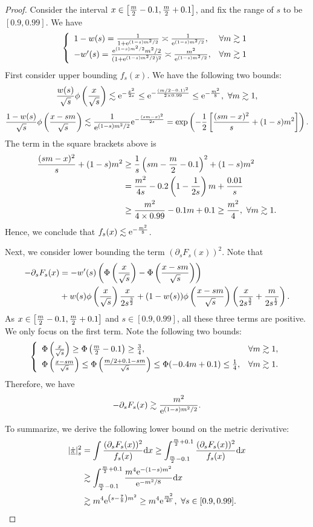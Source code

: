 \begin{proof}
Consider the interval $x\in\left[\frac{m}{2}-0.1,\frac{m}{2}+0.1\right]$, and fix the range of $s$ to be $[0.9,0.99]$. We have
$$\left\{
\begin{array}{ll}
     1-w(s)=\frac{1}{1+\mathrm{e}^{(1-s)m^2/2}}\asymp\frac{1}{\mathrm{e}^{(1-s)m^2/2}},&\forall m\gtrsim1 \\
     -w'(s)=\frac{\mathrm{e}^{(1-s)m^2/2}m^2/2}{(1+\mathrm{e}^{(1-s)m^2/2})^2}\asymp\frac{m^2}{\mathrm{e}^{(1-s)m^2/2}},&\forall m\gtrsim1
\end{array}
\right.$$
First consider upper bounding $f_s(x)$. We have the following two bounds:
$$\frac{w(s)}{\sqrt{s}}\phi\left(\frac{x}{\sqrt{s}}\right)\lesssim\mathrm{e}^{-\frac{x^2}{2s}}\le\mathrm{e}^{-\frac{(m/2-0.1)^2}{2\times0.99}}\le\mathrm{e}^{-\frac{m^2}{8}},~\forall m\gtrsim1,$$
$$\frac{1-w(s)}{\sqrt{s}}\phi\left(\frac{x-sm}{\sqrt{s}}\right)\lesssim\frac{1}{\mathrm{e}^{(1-s)m^2/2}}\mathrm{e}^{-\frac{(sm-x)^2}{2s}}=\exp\left(-\frac{1}{2}\left[\frac{(sm-x)^2}{s}+(1-s)m^2\right]\right).$$
The term in the square brackets above is
\begin{align*}
    \frac{(sm-x)^2}{s}+(1-s)m^2&\ge\frac{1}{s}\left(sm-\frac{m}{2}-0.1\right)^2+(1-s)m^2\\
    &=\frac{m^2}{4s}-0.2\left(1-\frac{1}{2s}\right)m+\frac{0.01}{s}\\
    &\ge\frac{m^2}{4\times0.99}-0.1m+0.1\ge\frac{m^2}{4},~\forall m\gtrsim1.
\end{align*}
Hence, we conclude that $f_s(x)\lesssim\mathrm{e}^{-\frac{m^2}{8}}$.

Next, we consider lower bounding the term $(\partial_sF_s(x))^2$. Note that
\begin{align*}
    -\partial_sF_s(x)&=-w'(s)\left(\Phi\left(\frac{x}{\sqrt{s}}\right)-\Phi\left(\frac{x-sm}{\sqrt{s}}\right)\right)\\
    &+w(s)\phi\left(\frac{x}{\sqrt{s}}\right)\frac{x}{2s^{\frac32}}+(1-w(s))\phi\left(\frac{x-sm}{\sqrt{s}}\right)\left(\frac{x}{2s^{\frac32}}+\frac{m}{2s^{\frac12}}\right).    
\end{align*}
As $x\in\left[\frac{m}{2}-0.1,\frac{m}{2}+0.1\right]$ and $s\in[0.9,0.99]$, all these three terms are positive. We only focus on the first term. Note the following two bounds:
$$\left\{
\begin{array}{ll}
\Phi\left(\frac{x}{\sqrt{s}}\right)\ge\Phi\left(\frac{m}{2}-0.1\right)\ge\frac{3}{4},&\forall m\gtrsim1,\\
\Phi\left(\frac{x-sm}{\sqrt{s}}\right)\le\Phi\left(\frac{m/2+0.1-sm}{\sqrt{s}}\right)\le\Phi(-0.4m+0.1)\le\frac{1}{4},&\forall m\gtrsim1.
\end{array}
\right.$$
Therefore, we have
$$-\partial_sF_s(x)\gtrsim\frac{m^2}{\mathrm{e}^{(1-s)m^2/2}}.$$

To summarize, we derive the following lower bound on the metric derivative:
\begin{align*}
    |\dot{\underline{\pi}}|_s^2&=\int\frac{(\partial_sF_s(x))^2}{f_s(x)}\mathrm{d} x\ge\int_{\frac{m}{2}-0.1}^{\frac{m}{2}+0.1}\frac{(\partial_sF_s(x))^2}{f_s(x)}\mathrm{d} x\\
    &\gtrsim\int_{\frac{m}{2}-0.1}^{\frac{m}{2}+0.1}\frac{m^4\mathrm{e}^{-(1-s)m^2}}{\mathrm{e}^{-m^2/8}}\mathrm{d} x\\
    &\gtrsim m^4\mathrm{e}^{\left(s-\frac{7}{8}\right)m^2}\ge m^4\mathrm{e}^{\frac{m^2}{40}},~\forall s\in[0.9,0.99].
\end{align*}


\end{proof}
